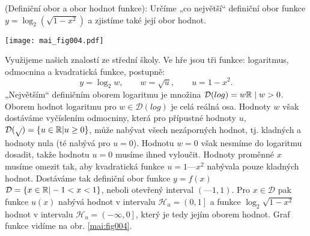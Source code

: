 \wikitextrule
\begin{example}\label{fyz:fey_exam017}
  (Definiční obor a obor hodnot funkce): Určíme „co největší“ definiční obor funkce 
  \(y=\log_2{(\sqrt{1-x^2})}\) a zjistíme také její obor hodnot.
      
  {\centering
   \captionsetup{type=figure}
%   
   \texttt{[image: mai\_fig004.pdf]}
  \par}
  
  Využijeme našich znalostí ze střední školy. Ve hře jsou tři funkce: logaritmus, odmocnina a 
  kvadratická funkce, postupně: 
  \begin{equation*}
    y = \log_2w, \qquad w = \sqrt{u}, \qquad u = 1 - x^2.
  \end{equation*}
  „Největším“ definičním oborem logaritmu je množina \(\mathcal{D}(log) = {w\mathbb{R} \mid w > 0}\).
  Oborem hodnot logaritmu pro \(w \in \mathcal{D}(log)\) je celá reálná osa. Hodnoty \(w\) však 
  dostáváme vyčíslením odmocniny, která pro přípustné hodnoty \(u\), \(\mathcal{D}(\sqrt{ }) = 
  \lbrace u\in\mathbb{R} | u\geq 0\rbrace\), může nabývat všech nezáporných hodnot, tj. kladných a 
  hodnoty nula (té nabývá pro \(u = 0\)). Hodnotu \(w = 0\) však nesmíme do logaritmu dosadit, 
  takže hodnotu \(u = 0\) musíme ihned vyloučit. Hodnoty proměnné \(x\) musíme omezit tak, aby 
  kvadratická funkce \(u = 1 — x^2\) nabývala pouze kladných hodnot. Dostáváme tak definiční obor 
  funkce \(y = f(x)\) \(\mathcal{D}=\lbrace x\in\mathbb{R} | -1<x<1\rbrace\), neboli otevřený 
  interval \((—1, 1)\). Pro \(x \in \mathcal{D}\) pak funkce \(u(x)\) nabývá hodnot v          
  intervalu \(\mathcal{H}_u = \left( 0, 1\right]\) a funkce \(\log_2\sqrt{1-x^2}\) hodnot v 
  intervalu \(\mathcal{H}_u = \left( -\infty, 0\right]\), který je tedy jejím oborem hodnot. Graf 
  funkce vidíme na obr. \ref{mai:fig004}. 
\end{example}